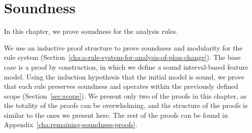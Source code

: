 \chapter{Soundness}
\label{cha:soundness}


In this chapter, we prove soundness for the analysis rules. 

We use an inductive proof structure to prove soundness and modularity for the rule system (Section~\vref{cha:a-rule-system-for-analysis-of-plan-change}). The base case is a proof by construction, in which we define a sound interval-based feature model. Using the induction hypothesis that the initial model is sound, we prove that each rule preserves soundness and operates within the previously defined scope (Section~\vref{sec:scope}). We present only two of the proofs in this chapter, as the totality of the proofs can be overwhelming, and the structure of the proofs is similar to the ones we present here. The rest of the proofs can be found in Appendix~\vref{cha:remaining-soundness-proofs}.








